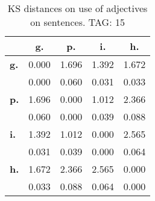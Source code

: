 \begin{table}[h!]
\begin{center}
\begin{tabular}{| l || c | c | c | c |}\hline
 & {\bf g.} & {\bf p.} & {\bf i.} & {\bf h.} \\\hline\hline
{\bf g.} & 0.000 & 1.696 & 1.392 & 1.672 \\
{\bf } & 0.000 & 0.060 & 0.031 & 0.033 \\\hline
{\bf p.} & 1.696 & 0.000 & 1.012 & 2.366 \\
{\bf } & 0.060 & 0.000 & 0.039 & 0.088 \\\hline
{\bf i.} & 1.392 & 1.012 & 0.000 & 2.565 \\
{\bf } & 0.031 & 0.039 & 0.000 & 0.064 \\\hline
{\bf h.} & 1.672 & 2.366 & 2.565 & 0.000 \\
{\bf } & 0.033 & 0.088 & 0.064 & 0.000 \\\hline
\end{tabular}
\caption{KS distances on use of adjectives on sentences. TAG: 15}
\end{center}
\end{table}